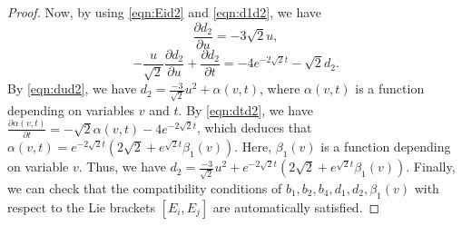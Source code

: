 \documentclass[reqno]{amsart}%
\theoremstyle{definition}
\numberwithin{equation}{section}
\begin{document}
\begin{proof}
Now, by using \eqref{eqn:Eid2} and \eqref{eqn:d1d2}, we have
\begin{equation}\label{eqn:dud2}
\frac{\partial d_2}{\partial u}=-3\sqrt{2}u,
\end{equation}
\begin{equation}\label{eqn:dtd2}
-\frac{u}{\sqrt{2}}\frac{\partial d_2}{\partial u}+\frac{\partial d_2}{\partial t}=
-4e^{-2\sqrt{2}t}-\sqrt{2}d_2.
\end{equation}
By \eqref{eqn:dud2}, we have $d_2=\frac{-3}{\sqrt{2}}u^2+\alpha(v,t)$,
where $\alpha(v,t)$ is a function depending on variables $v$ and $t$.
By \eqref{eqn:dtd2}, we have $\frac{\partial \alpha(v,t)}{\partial t}=-\sqrt{2}\alpha(v,t)-4e^{-2\sqrt{2}t}$, which deduces that
$\alpha(v,t)=e^{-2\sqrt{2}t}(2\sqrt{2}+e^{\sqrt{2}t}\beta_1(v))$.
Here, $\beta_1(v)$ is a function depending on variable $v$.
Thus, we have $d_2=\frac{-3}{\sqrt{2}}u^2+e^{-2\sqrt{2}t}(2\sqrt{2}+e^{\sqrt{2}t}\beta_1(v))$.
Finally, we can check that the compatibility conditions of  $b_1,b_2,b_4,d_1,d_2,\beta_1(v)$  with respect to the Lie brackets $[E_i,E_j]$ are automatically satisfied.



\end{proof}
\end{document}
